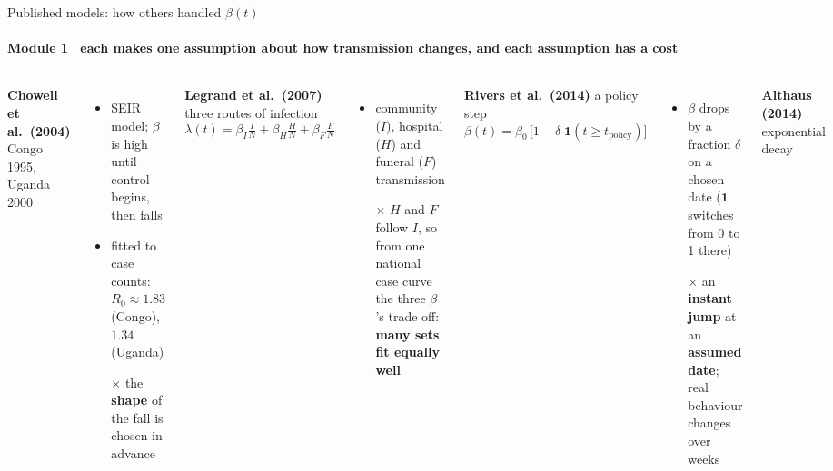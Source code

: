 \begin{frame}{Published models: how others handled $\beta(t)$}
\framesubtitle{Module 1 \textbullet\ each makes one assumption about how transmission changes, and each assumption has a cost}
\vspace{-2pt}
\begin{columns}[T,onlytextwidth]
  \footnotesize\raggedright
  \textbf{\color{mvPINN}Chowell et al.\ (2004)} {\scriptsize\color{mvMuted}Congo 1995, Uganda 2000}
  \begin{itemize}\setlength{\itemsep}{0pt}
    \item SEIR model; $\beta$ is high until control begins, then falls
    \item fitted to case counts: $R_0 \approx 1.83$ (Congo), $1.34$ (Uganda)
    \item[$\times$] the \textbf{shape} of the fall is chosen in advance
  \end{itemize}
  \vspace{4pt}
  \textbf{\color{mvPINN}Legrand et al.\ (2007)} {\scriptsize\color{mvMuted}three routes of infection}
  \[ \lambda(t) = \beta_I \tfrac{I}{N} + \beta_H \tfrac{H}{N} + \beta_F \tfrac{F}{N} \]
  \vspace{-10pt}
  \begin{itemize}\setlength{\itemsep}{0pt}
    \item community ($I$), hospital ($H$) and funeral ($F$) transmission
    \item[$\times$] $H$ and $F$ follow $I$, so from one national case curve the three $\beta$'s trade off: \textbf{many sets fit equally well}
  \end{itemize}
  \footnotesize\raggedright
  \textbf{\color{mvPINN}Rivers et al.\ (2014)} {\scriptsize\color{mvMuted}a policy step}
  \[ \beta(t) = \beta_0\,\big[1 - \delta\;\mathbf{1}(t \ge t_{\text{policy}})\big] \]
  \vspace{-10pt}
  \begin{itemize}\setlength{\itemsep}{0pt}
    \item $\beta$ drops by a fraction $\delta$ on a chosen date ($\mathbf{1}$ switches from 0 to 1 there)
    \item[$\times$] an \textbf{instant jump} at an \textbf{assumed date}; real behaviour changes over weeks
  \end{itemize}
  \vspace{4pt}
  \textbf{\color{mvPINN}Althaus (2014)} {\scriptsize\color{mvMuted}exponential decay}

\end{columns}
\end{frame}
